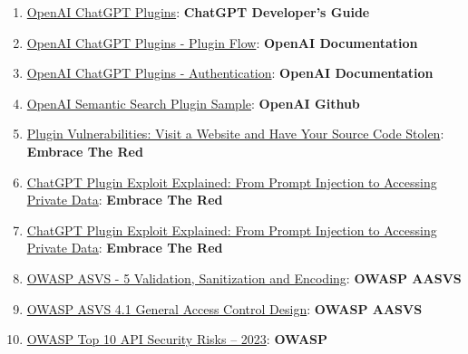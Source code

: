 \documentclass[
]{article}
\providecommand{\tightlist}{%
  \setlength{\itemsep}{0pt}\setlength{\parskip}{0pt}}
\begin{document}
\begin{enumerate}
\def\labelenumi{\arabic{enumi}.}
\tightlist
\item
  \href{https://platform.openai.com/docs/plugins/introduction}{OpenAI
  ChatGPT Plugins}: \textbf{ChatGPT Developer's Guide}
\item
  \href{https://platform.openai.com/docs/plugins/introduction/plugin-flow}{OpenAI
  ChatGPT Plugins - Plugin Flow}: \textbf{OpenAI Documentation}
\item
  \href{https://platform.openai.com/docs/plugins/authentication/service-level}{OpenAI
  ChatGPT Plugins - Authentication}: \textbf{OpenAI Documentation}
\item
  \href{https://github.com/openai/chatgpt-retrieval-plugin}{OpenAI
  Semantic Search Plugin Sample}: \textbf{OpenAI Github}
\item
  \href{https://embracethered.com/blog/posts/2023/chatgpt-plugin-vulns-chat-with-code/}{Plugin
  Vulnerabilities: Visit a Website and Have Your Source Code Stolen}:
  \textbf{Embrace The Red}
\item
  \href{https://embracethered.com/blog/posts/2023/chatgpt-cross-plugin-request-forgery-and-prompt-injection./}{ChatGPT
  Plugin Exploit Explained: From Prompt Injection to Accessing Private
  Data}: \textbf{Embrace The Red}
\item
  \href{https://embracethered.com/blog/posts/2023/chatgpt-cross-plugin-request-forgery-and-prompt-injection./}{ChatGPT
  Plugin Exploit Explained: From Prompt Injection to Accessing Private
  Data}: \textbf{Embrace The Red}
\item
  \href{https://owasp-aasvs4.readthedocs.io/en/latest/V5.html\#validation-sanitization-and-encoding}{OWASP
  ASVS - 5 Validation, Sanitization and Encoding}: \textbf{OWASP AASVS}
\item
  \href{https://owasp-aasvs4.readthedocs.io/en/latest/V4.1.html\#general-access-control-design}{OWASP
  ASVS 4.1 General Access Control Design}: \textbf{OWASP AASVS}
\item
  \href{https://owasp.org/API-Security/editions/2023/en/0x11-t10/}{OWASP
  Top 10 API Security Risks -- 2023}: \textbf{OWASP}
\end{enumerate}
\end{document}
